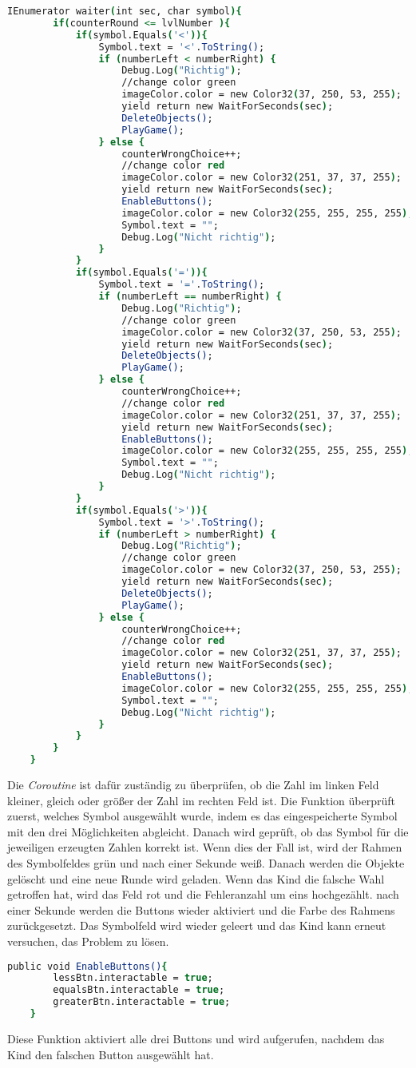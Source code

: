 \begin{lstlisting}[language=csh, caption={GameQuantities.cs waiter Funktion}]
IEnumerator waiter(int sec, char symbol){
		if(counterRound <= lvlNumber ){
			if(symbol.Equals('<')){
				Symbol.text = '<'.ToString();
				if (numberLeft < numberRight) {
					Debug.Log("Richtig");
					//change color green
					imageColor.color = new Color32(37, 250, 53, 255);
					yield return new WaitForSeconds(sec);
					DeleteObjects();
					PlayGame();
				} else {
					counterWrongChoice++;
					//change color red
					imageColor.color = new Color32(251, 37, 37, 255);
					yield return new WaitForSeconds(sec);
					EnableButtons();
					imageColor.color = new Color32(255, 255, 255, 255);
					Symbol.text = "";
					Debug.Log("Nicht richtig");
				}
			}
			if(symbol.Equals('=')){
				Symbol.text = '='.ToString();
				if (numberLeft == numberRight) {
					Debug.Log("Richtig");
					//change color green
					imageColor.color = new Color32(37, 250, 53, 255);
					yield return new WaitForSeconds(sec);
					DeleteObjects();
					PlayGame();
				} else {
					counterWrongChoice++;
					//change color red
					imageColor.color = new Color32(251, 37, 37, 255);
					yield return new WaitForSeconds(sec);
					EnableButtons();
					imageColor.color = new Color32(255, 255, 255, 255);
					Symbol.text = "";
					Debug.Log("Nicht richtig");
				}
			}
			if(symbol.Equals('>')){
				Symbol.text = '>'.ToString();
				if (numberLeft > numberRight) {
					Debug.Log("Richtig");
					//change color green
					imageColor.color = new Color32(37, 250, 53, 255);
					yield return new WaitForSeconds(sec);
					DeleteObjects();
					PlayGame();
				} else {
					counterWrongChoice++;
					//change color red
					imageColor.color = new Color32(251, 37, 37, 255);
					yield return new WaitForSeconds(sec);
					EnableButtons();
					imageColor.color = new Color32(255, 255, 255, 255);
					Symbol.text = "";
					Debug.Log("Nicht richtig");
				}
			}
		}
	}
\end{lstlisting}
Die \textit{Coroutine} ist dafür zuständig zu überprüfen, ob die Zahl im linken Feld kleiner, gleich oder größer der Zahl im rechten Feld ist. Die Funktion überprüft zuerst, welches Symbol ausgewählt wurde, indem es das eingespeicherte Symbol mit den drei Möglichkeiten abgleicht. Danach wird geprüft, ob das Symbol für die jeweiligen erzeugten Zahlen korrekt ist. Wenn dies der Fall ist, wird der Rahmen des Symbolfeldes grün und nach einer Sekunde weiß. Danach werden die Objekte gelöscht und eine neue Runde wird geladen. Wenn das Kind die falsche Wahl getroffen hat, wird das Feld rot und die Fehleranzahl um eins hochgezählt. nach einer Sekunde werden die Buttons wieder aktiviert und die Farbe des Rahmens zurückgesetzt. Das Symbolfeld wird wieder geleert und das Kind kann erneut versuchen, das Problem zu lösen.\\
\begin{lstlisting}[language=csh, caption={GameQuantities.cs EnableButtons Funktion}]
	public void EnableButtons(){
		lessBtn.interactable = true;
		equalsBtn.interactable = true;
		greaterBtn.interactable = true;
	}
\end{lstlisting}
Diese Funktion aktiviert alle drei Buttons und wird aufgerufen, nachdem das Kind den falschen Button ausgewählt hat.
